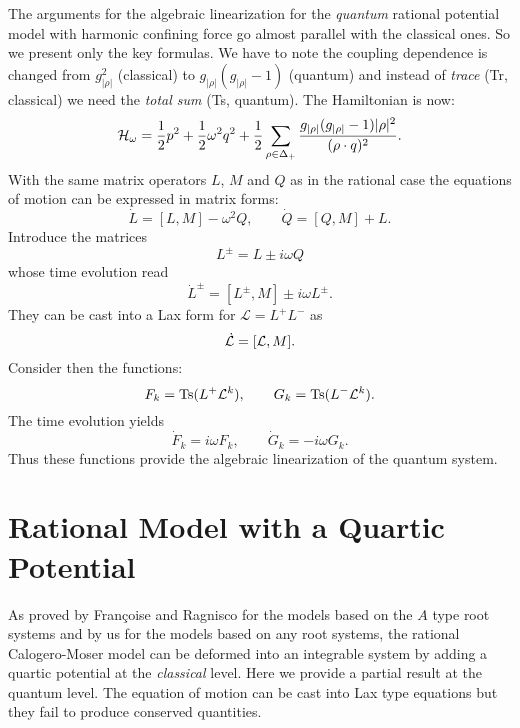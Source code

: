 \documentclass[a4paper,12pt]{article}
\begin{document}
The arguments for the algebraic linearization for the {\em quantum}
rational potential model with harmonic confining force go almost parallel
with the classical ones. So we present only the key formulas.
We have to note the coupling dependence is changed
from $g_{|\rho|}^2$ (classical) to $g_{|\rho|}(g_{|\rho|}-1)$ (quantum)
and instead of {\em trace} (Tr, classical)
we need the {\em total sum} (Ts, quantum).
The Hamiltonian is now:
\begin{equation}
    {\cal H}_{\omega}={1\over2}p^2+{1\over2}\omega^2q^2+
       {1\over2}\sum_{\rho\in\Delta_+}
     {g_{|\rho|}(g_{|\rho|}-1) |\rho|^{2}\over{(\rho\cdot
          q)^2}}.
     \label{harmham}
\end{equation}
With the same matrix operators $L$, $M$ and $Q$ as in the rational case
the equations of motion can be expressed in matrix forms:
\begin{equation}\label{RCPL}
  \dot{L}=[L,M]-\omega^2Q, \qquad
  \dot{Q}=[Q,M]+L.
\end{equation}
Introduce the matrices
\begin{equation}
L^{\pm}=L\pm i\omega Q
\end{equation}
whose time evolution read
\begin{equation}
\dot{L}^\pm
 = [L^\pm, M]\pm i\omega L^\pm.
\end{equation}
They can be cast into a Lax form for ${\mathcal L}=L^+L^-$ as
\begin{equation}
    \dot{{\cal L}}=[{\cal L},M].
\label{calLlax}
\end{equation}
Consider then the functions:
\begin{equation}
F_{k}=\mbox{Ts}(L^{+}{\cal L}^{k}), \qquad
G_{k}=\mbox{Ts}(L^{-}{\cal L}^{k}). \label{fgharm}
\end{equation}
The time evolution yields
\begin{equation}
\dot{F}_{k}=i\omega F_{k}, \qquad
\dot{G}_{k}=-i\omega G_{k}.
\end{equation}
Thus these functions provide the algebraic
linearization of the quantum system.

\section{Rational Model with a
Quartic Potential}
\label{quartic}
\setcounter{equation}{0}

As proved by Fran\c{c}oise and Ragnisco \cite{fr} for the models based on
the $A$ type root systems  and by us \cite{cfs} for the models
based on any root systems,
the rational Calogero-Moser model can be deformed into an
integrable system by adding a quartic potential at the {\em classical}
level.
Here we provide a partial result at the quantum level.
The equation of motion can be cast into  Lax type equations but
they fail to produce  conserved quantities.
\end{document}
